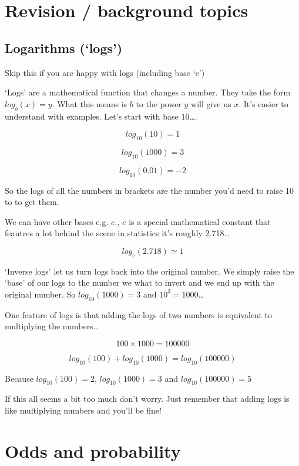 \documentclass[]{tufte-handout}
\begin{document}
\hypertarget{revision-background-topics}{%
\section{Revision / background
topics}\label{revision-background-topics}}

\hypertarget{logarithms-logs}{%
\subsection{Logarithms (`logs')}\label{logarithms-logs}}

Skip this if you are happy with logs (including base `e')

`Logs' are a mathematical function that changes a number. They take the
form \(log_b(x)=y\). What this means is \(b\) to the power \(y\) will
give us \(x\). It's easier to understand with examples. Let's start with
base 10\ldots{}.

\[log_{10}(10)=1\]

\[log_{10}(1000)=3\]

\[log_{10}(0.01)=-2\]

So the logs of all the numbers in brackets are the number you'd need to
raise 10 to to get them.

We can have other bases e.g. \(e\)., \(e\) is a special mathematical
constant that feautres a lot behind the scene in statistics it's roughly
2.718\ldots{}

\[log_e(2.718)\simeq1\]

`Inverse logs' let us turn logs back into the original number. We simply
raise the `base' of our logs to the number we what to invert and we end
up with the original number. So \(log_{10}(1000)=3\) and
\(10^3=1000\)\ldots{}

One feature of logs is that adding the logs of two numbers is equivalent
to multiplying the numbers\ldots{}

\[100 \times 1000 = 100000\]

\[log_{10}(100) + log_{10}(1000) = log_{10}(100000)\]

Because \(log_{10}(100) = 2\), \(log_{10}(1000)=3\) and
\(log_{10}(100000)=5\)

If this all seems a bit too much don't worry. Just remember that adding
logs is like multiplying numbers and you'll be fine!

\hypertarget{odds-and-probability}{%
\section{Odds and probability}\label{odds-and-probability}}
\end{document}
